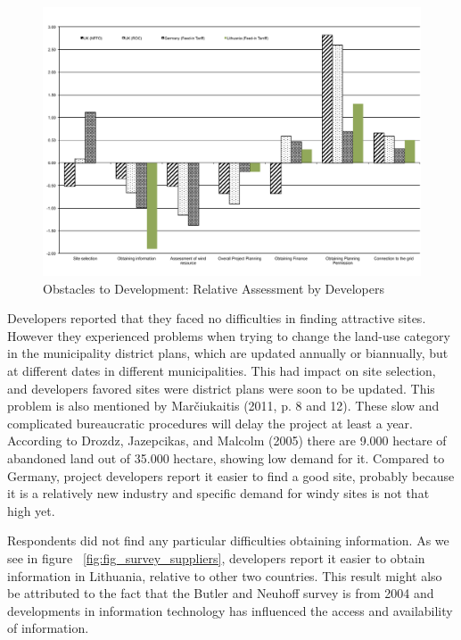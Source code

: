 \documentclass[a4paper, 12pt]{article}
\begin{document}
\begin{figure}
	\centering
	\includegraphics[width=1\textwidth]{fig_survey_barriers}
	\caption{Obstacles to Development: Relative Assessment by Developers}
	\label{fig:fig_survey_barriers}
\end{figure}

Developers reported that they faced no difficulties in finding attractive sites. However they experienced problems when trying to change the land-use category in the municipality district plans, which are updated annually or biannually, but at different dates in different municipalities. This had impact on site selection, and developers favored sites were district plans were soon to be updated. This problem is also mentioned by Marčiukaitis (2011, p. 8 and 12). These slow and complicated bureaucratic procedures will delay the project at least a year. According to Drozdz, Jazepcikas, and Malcolm (2005) there are 9.000 hectare of abandoned land out of 35.000 hectare, showing low demand for it. Compared to Germany, project developers report it easier to find a good site, probably because it is a relatively new industry and specific demand for windy sites is not that high yet.

Respondents did not find any particular difficulties obtaining information. As we see in figure ~\ref{fig:fig_survey_suppliers}, developers report it easier to obtain information in Lithuania, relative to other two countries. This result might also be attributed to the fact that the Butler and Neuhoff survey is from 2004 and developments in information technology has influenced the access and availability of information.
\end{document}
